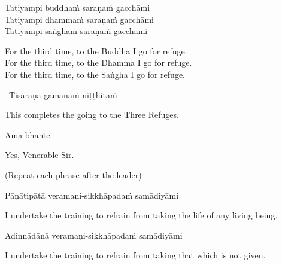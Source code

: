 Tatiyampi buddhaṁ saraṇaṁ gacchāmi\\
Tatiyampi dhammaṁ saraṇaṁ gacchāmi\\
Tatiyampi saṅghaṁ saraṇaṁ gacchāmi

\begin{english-verses}
  For the third time, to the Buddha I go for refuge.\\
  For the third time, to the Dhamma I go for refuge.\\
  For the third time, to the Saṅgha I go for refuge.
\end{english-verses}

\begin{leader-only}
  \anglebracketleft\ \hspace{-0.5mm}Tisaraṇa-gamanaṁ niṭṭhitaṁ \hspace{-0.5mm}\anglebracketright\
\end{leader-only}

\begin{english}
  This completes the going to the Three Refuges.
\end{english}

Āma bhante

\begin{english}
  Yes, Venerable Sir.
\end{english}

\clearpage

\begin{center}
  \textbf{}
\end{center}

\begin{center}
  (Repeat each phrase after the leader)
\end{center}

Pāṇātipātā veramaṇi-sikkhāpadaṁ samādiyāmi

\begin{english-hang}
  I undertake the training\hyperlink{endnote139-appendix}{\hypertarget{endnote139-body}{}}
  to refrain from taking the life of any living being.
\end{english-hang}

Adinnādānā veramaṇi-sikkhāpadaṁ samādiyāmi

\begin{english}
  I undertake the training to refrain from taking that which is not given.
\end{english}

